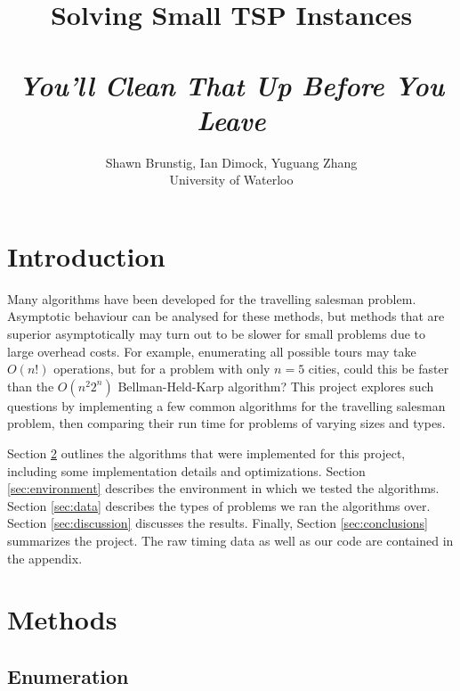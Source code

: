 \documentclass[11pt]{article}
\begin{document}
\thispagestyle{empty}

\title{Solving Small TSP Instances \\ ~ \\ \textit{You'll Clean That Up Before You Leave}}

\author{Shawn Brunstig, Ian Dimock, Yuguang Zhang \\ University of Waterloo}

\maketitle


\section{Introduction}

Many algorithms have been developed for the travelling salesman problem. Asymptotic behaviour can be analysed for these methods, but methods that are superior asymptotically may turn out to be slower for small problems due to large overhead costs. For example, enumerating all possible tours may take $O(n!)$ operations, but for a problem with only $n=5$ cities, could this be faster than the $O(n^2 2^n)$ Bellman-Held-Karp algorithm? This project explores such questions by implementing a few common algorithms for the travelling salesman problem, then comparing their run time for problems of varying sizes and types.

Section \ref{sec:methods} outlines the algorithms that were implemented for this project, including some implementation details and optimizations. Section \ref{sec:environment} describes the environment in which we tested the algorithms. Section \ref{sec:data} describes the types of problems we ran the algorithms over. Section \ref{sec:discussion} discusses the results. Finally, Section \ref{sec:conclusions} summarizes the project. The raw timing data as well as our code are contained in the appendix.

\section{Methods}
\label{sec:methods}

\subsection{Enumeration}
\end{document}

